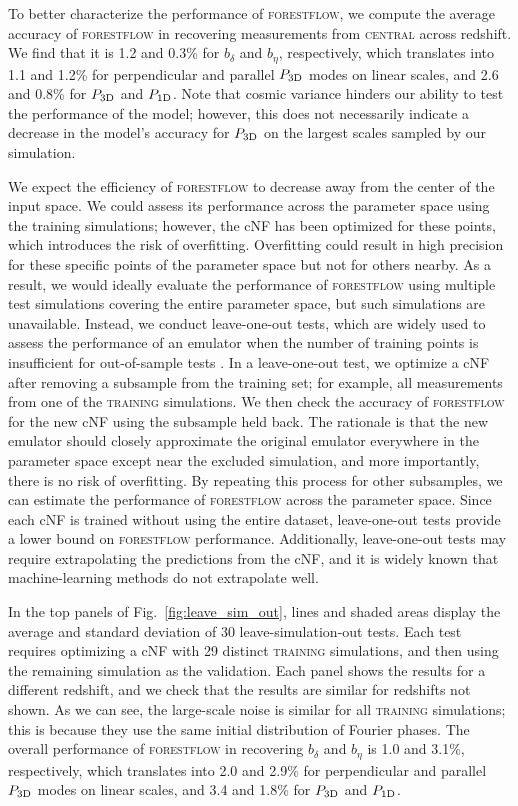 \documentclass[longauth]{aa}
\newcommand{\poned}{\ensuremath{P_{\rm 1D}}\xspace}
\newcommand{\pthreed}{\ensuremath{P_{\rm 3D}}\xspace}
\newcommand{\forestflow}{\textsc{forestflow}\xspace}
\newcommand{\lacehc}{\textsc{training}\xspace}
\newcommand{\simcentral}{\textsc{central}\xspace}
\begin{document}
To better characterize the performance of \forestflow, we compute the average accuracy of \forestflow in recovering measurements from \simcentral across redshift. We find that it is 1.2 and 0.3\% for $b_\delta$ and $b_\eta$, respectively, which translates into 1.1 and 1.2\% for perpendicular and parallel \pthreed modes on linear scales, and 2.6 and 0.8\% for \pthreed and \poned. Note that cosmic variance hinders our ability to test the performance of the model; however, this does not necessarily indicate a decrease in the model's accuracy for \pthreed on the largest scales sampled by our simulation.

We expect the efficiency of \forestflow to decrease away from the center of the input space. We could assess its performance across the parameter space using the training simulations; however, the cNF has been optimized for these points, which introduces the risk of overfitting. Overfitting could result in high precision for these specific points of the parameter space but not for others nearby. As a result, we would ideally evaluate the performance of \forestflow using multiple test simulations covering the entire parameter space, but such simulations are unavailable. Instead, we conduct leave-one-out tests, which are widely used to assess the performance of an emulator when the number of training points is insufficient for out-of-sample tests \citep[e.g.,][]{hastie01statisticallearning}. In a leave-one-out test, we optimize a cNF after removing a subsample from the training set; for example, all measurements from one of the \lacehc simulations. We then check the accuracy of \forestflow for the new cNF using the subsample held back. The rationale is that the new emulator should closely approximate the original emulator everywhere in the parameter space except near the excluded simulation, and more importantly, there is no risk of overfitting. By repeating this process for other subsamples, we can estimate the performance of \forestflow across the parameter space. Since each cNF is trained without using the entire dataset, leave-one-out tests provide a lower bound on \forestflow performance. Additionally, leave-one-out tests may require extrapolating the predictions from the cNF, and it is widely known that machine-learning methods do not extrapolate well.

In the top panels of Fig.~\ref{fig:leave_sim_out}, lines and shaded areas display the average and standard deviation of 30 leave-simulation-out tests. Each test requires optimizing a cNF with 29 distinct \lacehc simulations, and then using the remaining simulation as the validation. Each panel shows the results for a different redshift, and we check that the results are similar for redshifts not shown. As we can see, the large-scale noise is similar for all \lacehc simulations; this is because they use the same initial distribution of Fourier phases. The overall performance of \forestflow in recovering $b_\delta$ and $b_\eta$ is 1.0 and 3.1\%, respectively, which translates into 2.0 and 2.9\% for perpendicular and parallel \pthreed modes on linear scales, and 3.4 and 1.8\% for \pthreed and \poned.
\end{document}
